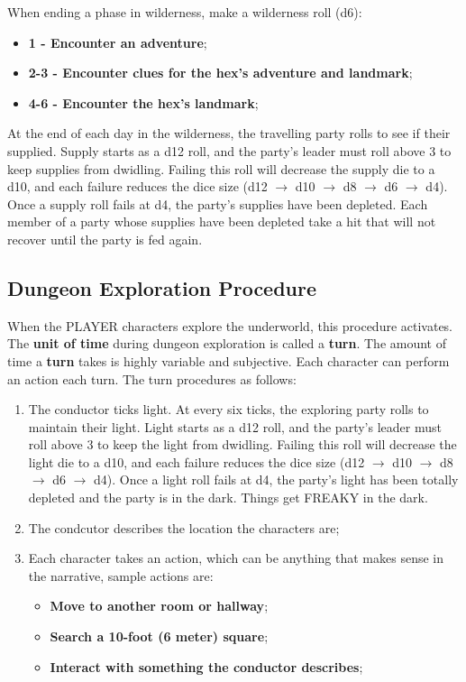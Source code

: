 When ending a phase in wilderness, make a wilderness roll (d6):
\begin{itemize}
    \item {\textbf{1 - Encounter an adventure};}
    \item {\textbf{2-3 - Encounter clues for the hex's adventure and landmark};}
    \item {\textbf{4-6 - Encounter the hex's landmark};}
\end{itemize}
At the end of each day in the wilderness, the travelling party rolls to see if their supplied. Supply starts as a d12 roll, and the party's leader must roll above 3 to keep supplies from dwidling. Failing this roll will decrease the supply die to a d10, and each failure reduces the dice size (d12 $\rightarrow$ d10 $\rightarrow$ d8 $\rightarrow$ d6 $\rightarrow$ d4). Once a supply roll fails at d4, the party's supplies have been depleted. Each member of a party whose supplies have been depleted take a hit that will not recover until the party is fed again.

\subsection{Dungeon Exploration Procedure}
When the PLAYER characters explore the underworld, this procedure activates. The \textbf{unit of time} during dungeon exploration is called a \textbf{turn}. The amount of time a \textbf{turn} takes is highly variable and subjective. Each character can perform an action each turn. The turn procedures as follows:
\begin{enumerate}
    \item {The conductor ticks light. At every six ticks, the exploring party rolls to maintain their light. Light starts as a d12 roll, and the party's leader must roll above 3 to keep the light from dwidling. Failing this roll will decrease the light die to a d10, and each failure reduces the dice size (d12 $\rightarrow$ d10 $\rightarrow$ d8 $\rightarrow$ d6 $\rightarrow$ d4). Once a light roll fails at d4, the party's light has been totally depleted and the party is in the dark. Things get FREAKY in the dark.}
    \item {The condcutor describes the location the characters are;}
    \item {Each character takes an action, which can be anything that makes sense in the narrative, sample actions are:
    \begin{itemize}
        \item {\textbf{Move to another room or hallway};}
        \item {\textbf{Search a 10-foot (6 meter) square};}
        \item {\textbf{Interact with something the conductor describes};}
    \end{itemize}
    }
\end{enumerate}

